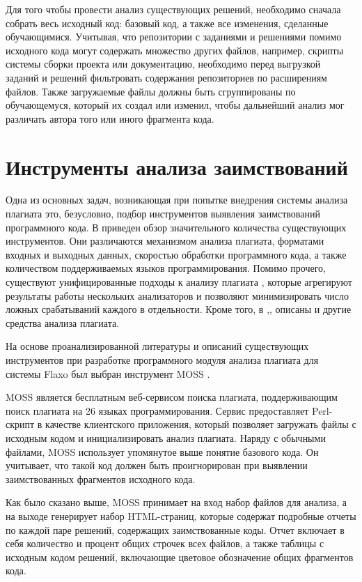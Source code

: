 \documentclass[a4paper,14pt]{extarticle}
\begin{document}
Для того чтобы провести анализ существующих решений, необходимо сначала собрать весь исходный код: базовый код, а также все изменения, сделанные обучающимися. Учитывая, что репозитории с заданиями и решениями помимо исходного кода могут содержать множество других файлов, например, скрипты системы сборки проекта или документацию, необходимо перед выгрузкой заданий и решений фильтровать содержания репозиториев по расширениям файлов. Также загружаемые файлы должны быть сгруппированы по обучающемуся, который их создал или изменил, чтобы дальнейший анализ мог различать автора того или иного фрагмента кода. 

\section{Инструменты анализа заимствований}

Одна из основных задач, возникающая при попытке внедрения системы анализа плагиата это, безусловно, подбор инструментов выявления заимствований программного кода. В \citep{plagiarismToolsSurvey} приведен обзор значительного количества существующих инструментов. Они различаются механизмом анализа плагиата, форматами входных и выходных данных, скоростью обработки программного кода, а также количеством поддерживаемых языков программирования. Помимо прочего, существуют унифицированные подходы к анализу плагиата \citep{unifiedPlagiarismDetectionTool}\citep{gitplagThesis}, которые агрегируют результаты работы нескольких анализаторов и позволяют минимизировать число ложных срабатываний каждого в отдельности. Кроме того, в \citep{codeStyleDetectionTool},\citep{anotherPlagAnalysisTool},\citep{languageIndependentPlagiarismTool} описаны и другие средства анализа плагиата.

На основе проанализированной литературы и описаний существующих инструментов при разработке программного модуля анализа плагиата для системы Flaxo был выбран инструмент MOSS \citep{mossOriginalPaper}.

MOSS является бесплатным веб-сервисом поиска плагиата, поддерживающим поиск плагиата на 26 языках программирования. Сервис предоставляет Perl-скрипт в качестве клиентского приложения, который позволяет загружать файлы с исходным кодом и инициализировать анализ плагиата. Наряду с обычными файлами, MOSS использует упомянутое выше понятие базового кода. Он учитывает, что такой код должен быть проигнорирован при выявлении заимствованных фрагментов исходного кода.

Как было сказано выше, MOSS принимает на вход набор файлов для анализа, а на выходе генерирует набор HTML-страниц, которые содержат подробные отчеты по каждой паре решений, содержащих заимствованные коды. Отчет включает в себя количество и процент общих строчек всех файлов, а также таблицы с исходным кодом решений, включающие цветовое обозначение общих фрагментов кода.
\end{document}
